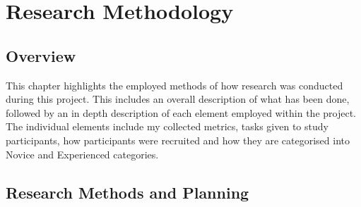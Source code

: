 \chapter{Research Methodology}

\section{Overview}
This chapter highlights the employed methods of how research was conducted during this project. This includes an overall description of what has been done, followed by an in depth description of each element employed within the project. The individual elements include my collected metrics, tasks given to study participants, how participants were recruited and how they are categorised into Novice and Experienced categories.

\section{Research Methods and Planning}
